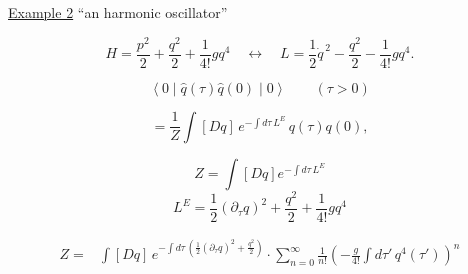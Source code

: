 \begin{center}
  \underline{Example 2}\hspace{3em}
  \textquotedblleft an harmonic oscillator\textquotedblright
\end{center}

\[
 H=\frac{p^2}{2}+\frac{q^2}{2}+\frac{1}{4!}gq^4
 \quad\longleftrightarrow\quad
 L=\frac{1}{2}\dot q^{\,2}-\frac{q^2}{2}-\frac{1}{4!}gq^4.
\]


\[
 \left\langle 0\middle|\widehat q(\tau)\widehat q(0)\middle|0\right\rangle
 \qquad (\tau>0)
\]

\YinBlue{%
\[
 \left\langle 0\middle|\widehat q(\tau)\widehat q(0)\middle|0\right\rangle
 =\sum_n
 \left|\left\langle n\middle|\widehat q(0)\middle|0\right\rangle\right|^2
 e^{-E_n\tau}
\]}

\begin{center}
\end{center}

\[
 =\frac{1}{Z}\int [Dq]\,e^{-\int d\tau\,L^E}\,q(\tau)q(0),
\]

\[
 Z=\int [Dq]e^{-\int d\tau\,L^E}
\]
\[
 L^E=\frac{1}{2}(\partial_\tau q)^2+\frac{q^2}{2}+\frac{1}{4!}gq^4
\]





\[
\begin{aligned}
 Z={}&\int [Dq]\,e^{-\int d\tau\,\left(\frac{1}{2}(\partial_\tau q)^2+\frac{q^2}{2}\right)}
 \cdot\sum_{n=0}^{\infty}\frac{1}{n!}
 \left(-\frac{g}{4!}\int d\tau'\,q^4(\tau')\right)^n
\end{aligned}
\]

